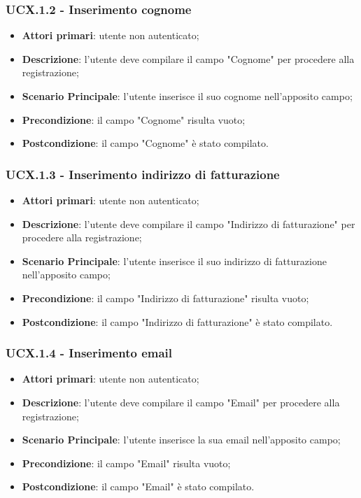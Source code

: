 \subsubsection{UCX.1.2 - Inserimento cognome}
\begin{itemize}
\item \textbf{Attori primari}: utente non autenticato;
\item \textbf{Descrizione}: l'utente deve compilare il campo "Cognome" per procedere alla registrazione;
\item \textbf{Scenario Principale}: l'utente inserisce il suo cognome nell'apposito campo;
\item \textbf{Precondizione}: il campo "Cognome" risulta vuoto;
\item \textbf{Postcondizione}: il campo "Cognome" è stato compilato.
\end{itemize}

\subsubsection{UCX.1.3 - Inserimento indirizzo di fatturazione}
\begin{itemize}
\item \textbf{Attori primari}: utente non autenticato;
\item \textbf{Descrizione}: l'utente deve compilare il campo "Indirizzo di fatturazione" per procedere alla registrazione;
\item \textbf{Scenario Principale}: l'utente inserisce il suo indirizzo di fatturazione nell'apposito campo;
\item \textbf{Precondizione}: il campo "Indirizzo di fatturazione" risulta vuoto;
\item \textbf{Postcondizione}: il campo "Indirizzo di fatturazione" è stato compilato.
\end{itemize}

\subsubsection{UCX.1.4 - Inserimento email}
\begin{itemize}
\item \textbf{Attori primari}: utente non autenticato;
\item \textbf{Descrizione}: l'utente deve compilare il campo "Email" per procedere alla registrazione;
\item \textbf{Scenario Principale}: l'utente inserisce la sua email nell'apposito campo;
\item \textbf{Precondizione}: il campo "Email" risulta vuoto;
\item \textbf{Postcondizione}: il campo "Email" è stato compilato.
\end{itemize}

